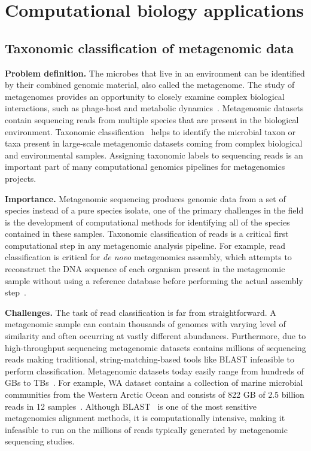 
\section{Computational biology applications}


\subsection{Taxonomic classification of metagenomic data}

{\bf Problem definition.}
The microbes that live in an environment can be identified by their combined genomic material, also called the metagenome.
The study of metagenomes provides an opportunity to closely examine complex biological interactions, such as phage-host and metabolic dynamics~\cite{national2007new}.
Metagenomic datasets contain sequencing reads from multiple species that are present in the biological environment.
%
Taxonomic classification~\cite{wood2014kraken} helps to identify the microbial taxon or taxa present in large-scale  metagenomic datasets coming from complex biological and environmental samples. Assigning taxonomic labels to sequencing reads is an important part of many computational genomics pipelines for metagenomics projects.

\noindent
{\bf Importance.}
Metagenomic sequencing produces genomic data from a set of species instead of a pure species isolate, one of the primary challenges in the field is the development of computational methods for identifying all of the species contained in these samples.
%
Taxonomic classification of reads is a critical first computational step in any metagenomic analysis pipeline.
For example, read classification is critical for \emph{de novo} metagenomics assembly, which attempts to reconstruct the DNA sequence of each organism present in the metagenomic sample without using a reference database before performing the actual assembly step~\cite{venter2004environmental,brady2009phymm,brady2011phymmbl,rosen2008metagenome,segata2012metagenomic}.

\noindent
{\bf Challenges.}
The task of read classification is far from straightforward. 
A metagenomic sample can contain thousands of genomes with varying level of similarity and often occurring at vastly different abundances. Furthermore, due to high-throughput sequencing metagenomic datasets contains millions of sequencing reads making traditional, string-matching-based tools like BLAST infeasible to perform classification. Metagenomic datasets today easily range from hundreds of GBs to TBs~\cite{hofmeyr2020terabase}. For example, WA dataset contains a collection of marine microbial communities from the Western Arctic Ocean and consists of 822 GB of 2.5 billion reads in 12 samples~\cite{hofmeyr2020terabase}.
%
Although BLAST~\cite{altschul1990basic} is one of the most sensitive metagenomics alignment methods, it is computationally intensive, making it infeasible to run on the millions of reads typically generated by metagenomic sequencing studies.

